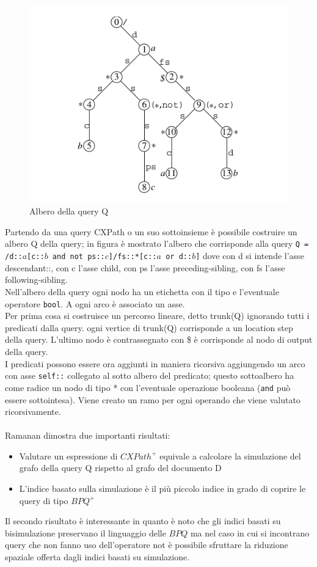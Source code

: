 \begin{figure}[h]
\centering
\includegraphics[scale=.5]{querytree.png}
\caption{Albero della query Q}
\end{figure}
Partendo da una query CXPath o un suo sottoinsieme è possibile costruire un albero Q della query; in figura è mostrato l'albero che corrisponde alla query 
\texttt{Q = /d::$a$[c::$b$ and not ps::$c$]/fs::*[c::$a$ or d::$b$]} dove con d si intende l'asse descendant::, con c l'asse child, con ps l'asse preceding-sibling, con fs l'asse following-sibling.\\
Nell'albero della query ogni nodo ha un etichetta con il tipo e l'eventuale operatore \texttt{bool}. A ogni arco è associato un asse.\\
Per prima cosa si costruisce un percorso lineare, detto trunk(Q) ignorando tutti i predicati dalla query.  ogni vertice di trunk(Q) corrisponde a un location step della query. L'ultimo nodo è contrassegnato con \$ è corrisponde al nodo di output della query.\\
I predicati possono essere ora aggiunti in maniera ricorsiva aggiungendo un arco con asse \texttt{self::} collegato al sotto albero del predicato; questo sottoalbero ha come radice un nodo di tipo * con l'eventuale operazione booleana (\texttt{and} può essere sottointesa). Viene creato un ramo per ogni operando che viene valutato ricorsivamente.
\\\\
Ramanan dimostra due importanti risultati:
\begin{itemize}
\item Valutare un espressione di $CXPath^+$ equivale a calcolare la simulazione del grafo della query Q rispetto al grafo del documento D
\item L'indice basato sulla simulazione è il più piccolo indice in grado di coprire le query di tipo $BPQ^+$
\end{itemize}
Il secondo risultato è interessante in quanto è noto che gli indici basati su bisimulazione preservano il linguaggio delle $BPQ$ ma nel caso in cui si incontrano query che non fanno uso dell'operatore not è possibile sfruttare la riduzione spaziale offerta dagli indici basati su simulazione.
